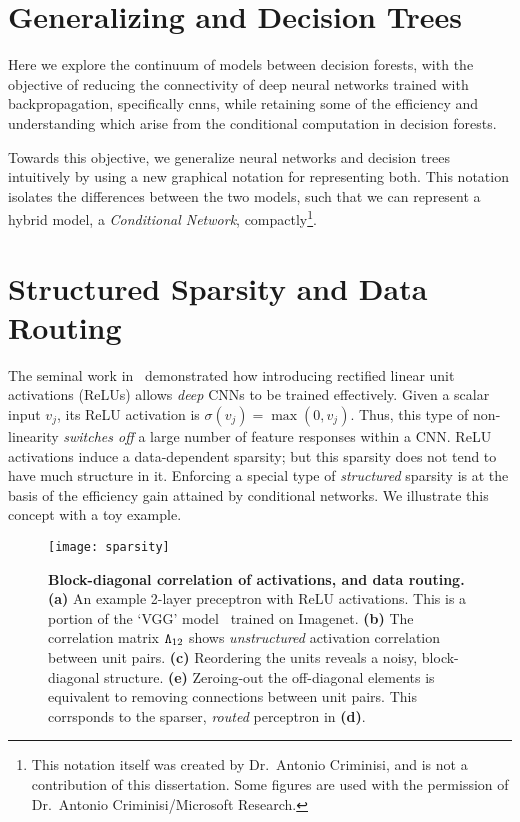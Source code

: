 \documentclass[thesis]{subfiles}
\begin{document}
	\section{Generalizing  and Decision Trees}
	Here we explore the continuum of models between decision forests, with the objective of reducing the connectivity of deep neural networks trained with backpropagation, specifically \glspl{cnn}, while retaining some of the efficiency and understanding which arise from the conditional computation in decision forests.
	
	Towards this objective, we generalize neural networks and decision trees intuitively by using a new graphical notation for representing both. This notation isolates the differences between the two models, such that we can represent a hybrid model, \ie a \emph{Conditional Network}, compactly\footnote{This notation itself was created by Dr.\ Antonio Criminisi, and is not a contribution of this dissertation. Some figures are used with the permission of Dr.\ Antonio Criminisi/Microsoft Research.}.
	
	\section{Structured Sparsity and Data Routing}
	\label{sec:structuredsparsity}
	The seminal work in~\cite{Krizhevsky2012} demonstrated how 
	introducing rectified linear unit activations (ReLUs) allows {\em deep} CNNs to be trained effectively. 
	Given a scalar input $v_j$, its ReLU activation is $\sigma(v_j)=\max(0, v_j)$. 
	Thus, this type of non-linearity \emph{switches off} a large number of feature responses within a CNN.
	ReLU activations induce a data-dependent sparsity; but this sparsity does not tend to have much structure in it. Enforcing a special type of {\em structured} sparsity is at the basis of the efficiency gain attained by conditional networks. We illustrate this concept with a toy example.

	\begin{figure}[tbp]
	\centerline{
	\texttt{[image: sparsity]}
	}
	\caption[Block-diagonal correlation of activations, and data routing]{{\bf Block-diagonal correlation of activations, and data routing.}
	{\bf (a)} An example 2-layer preceptron with ReLU activations. This is a portion of the `VGG' model~\cite{Simonyan2014verydeep} trained on Imagenet.
	{\bf (b)} The correlation matrix $\mat \Lambda_{12}$ shows {\em unstructured} activation correlation between unit pairs. 
	{\bf (c)} Reordering the units reveals a noisy, block-diagonal structure. 
	{\bf (e)} Zeroing-out the off-diagonal elements is equivalent to removing connections between unit pairs. This corrsponds to the sparser, {\em routed} perceptron in {\bf (d)}.
	}
	\label{fig:sparsity}
	\end{figure}
\end{document}
